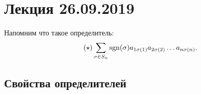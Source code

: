\section{Лекция 26.09.2019}

Напомним что такое определитель:
\begin{equation}
    \label{det:sum}
    \tag{$\star$}
    \sum_{\sigma \in S_n} \sgn(\sigma) a_{1\sigma(1)} a_{2\sigma(2)} \dots a_{n\sigma(n)}
.\end{equation}

\setcounter{theorem}{1}
\begin{comment}
    Каждое слагаемое содержит ровно 1 элемент из каждой строки и ровно 1 элемент из каждого столбца.
\end{comment}

\subsection{Свойства определителей}
